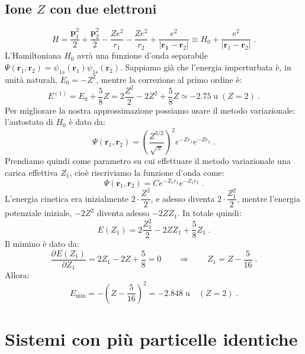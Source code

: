 \documentclass[12pt,a4paper]{report}
\theoremstyle{definition}
\newcommand{\pdev}[3][]{\frac{\partial^{#1} #2}{\partial #3^{#1}}}
\numberwithin{equation}{section}
\begin{document}
\section{Ione $Z$ con due elettroni}
\begin{equation}
H=\frac{\mathbf{p}_1^2}{2}+\frac{\mathbf{p}_2^2}{2}-\frac{Ze^2}{r_1}-\frac{Ze^2}{r_2}+\frac{e^2}{|\mathbf{r_1}-\mathbf{r}_2|}\equiv H_0+\frac{e^2}{|\mathbf{r}_1-\mathbf{r}_2|}\;.
\end{equation}
L'Hamiltoniana $H_0$ avrà una funzione d'onda separabile $\Psi(\mathbf{r}_1,\mathbf{r}_2)=\psi_{1s}(\mathbf{r}_1)\psi_{1s}(\mathbf{r}_2)$. Sappiamo già che l'energia imperturbata è, in unità naturali, $E_0=-Z^2$, mentre la correzione al primo ordine è:
\begin{equation}
E^{(1)}=E_0+\frac{5}{8}Z=2\frac{Z^2}{2}-2Z^2+\frac{5}{8}Z\simeq -2.75\;\mbox{u}\; (Z=2)\;.
\end{equation}
Per migliorare la nostra approssimazione possiamo usare il metodo variazionale: l'autostato di $H_0$ è dato da:
\begin{equation}
\Psi(\mathbf{r}_1,\mathbf{r}_2)=\left(\frac{Z^{3/2}}{\sqrt{\pi}}\right)^2e^{-Zr_1}e^{-Zr_2}\;.
\end{equation}
Prendiamo quindi come parametro su cui effettuare il metodo variazionale una carica effettiva $Z_1$, cioè riscriviamo la funzione d'onda come:
\begin{equation}
\Psi(\mathbf{r}_1,\mathbf{r}_2)=Ce^{-Z_1r_1}e^{-Z_1r_2}\;.
\end{equation}
L'energia cinetica era inizialmente $2\cdot\dfrac{Z^2}{2}$, e adesso diventa $2\cdot\dfrac{Z_1^2}{2}$, mentre l'energia potenziale iniziale, $-2Z^2$ diventa adesso $-2ZZ_1$. In totale quindi:
\begin{equation}
E(Z_1)=2\frac{Z_1^2}{2}-2ZZ_1+\frac{5}{8}Z_1\;.
\end{equation}
Il mimino è dato da:
\begin{equation}
\pdev{E(Z_1)}{Z_1}=2Z_1-2Z+\frac{5}{8}=0\qquad \Longrightarrow\qquad Z_1=Z-\frac{5}{16}\;.
\end{equation}
Allora:
\begin{equation}
E_{\mathrm{min}}=-\left(Z-\frac{5}{16}\right)^2=-2.848\;\mbox{u}\quad (Z=2)\;.
\end{equation}
\chapter{Sistemi con più particelle identiche}
\end{document}
